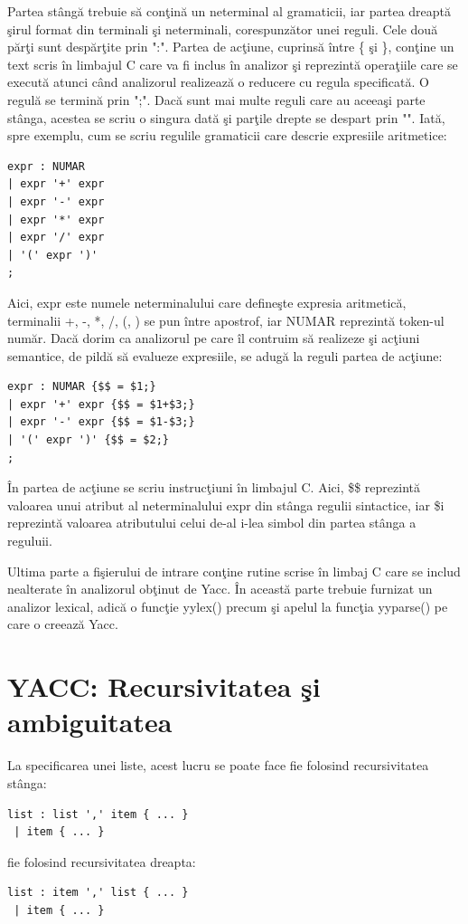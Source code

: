 Partea st\^{a}ng\u{a} trebuie s\u{a} con\c{t}in\u{a} un neterminal al gramaticii, iar partea dreapt\u{a} \c{s}irul format din terminali \c{s}i neterminali, corespunz\u{a}tor unei reguli. Cele dou\u{a} p\u{a}r\c{t}i sunt desp\u{a}r\c{t}ite prin ":". Partea de ac\c{t}iune, cuprins\u{a} \^{i}ntre \{ \c{s}i \}, con\c{t}ine un text scris \^{i}n limbajul C care va fi inclus \^{i}n analizor \c{s}i reprezint\u{a} opera\c{t}iile care se execut\u{a} atunci c\^{a}nd analizorul realizeaz\u{a} o reducere cu regula specificat\u{a}. O regul\u{a} se termin\u{a} prin ";". Dac\u{a} sunt mai multe reguli care au aceea\c{s}i parte st\^{a}nga, acestea se scriu o singura dat\u{a} \c{s}i par\c{t}ile drepte se despart prin "\textbar". Iat\u{a}, spre exemplu, cum se scriu regulile gramaticii care descrie expresiile aritmetice:
\begin{verbatim}
expr : NUMAR
| expr '+' expr
| expr '-' expr
| expr '*' expr
| expr '/' expr
| '(' expr ')'
;
\end{verbatim}

Aici, expr este numele neterminalului care define\c{s}te expresia aritmetic\u{a}, terminalii +, -, *, /, (, ) se pun \^{i}ntre apostrof, iar NUMAR reprezint\u{a} token-ul num\u{a}r. Dac\u{a} dorim ca analizorul pe care \^{i}l contruim s\u{a} realizeze \c{s}i ac\c{t}iuni semantice, de pild\u{a} s\u{a} evalueze expresiile, se adug\u{a} la reguli partea de ac\c{t}iune:
\begin{verbatim}
expr : NUMAR {$$ = $1;}
| expr '+' expr {$$ = $1+$3;}
| expr '-' expr {$$ = $1-$3;}
| '(' expr ')' {$$ = $2;}
;
\end{verbatim}

\^{I}n partea de ac\c{t}iune se scriu instruc\c{t}iuni \^{i}n limbajul C. Aici, \$\$ reprezint\u{a} valoarea unui atribut al neterminalului expr din st\^{a}nga regulii sintactice, iar \$i reprezint\u{a} valoarea atributului celui de-al i-lea simbol din partea st\^{a}nga a reguluii.

Ultima parte a fi\c{s}ierului de intrare con\c{t}ine rutine scrise \^{i}n limbaj C care se includ nealterate \^{i}n analizorul ob\c{t}inut de Yacc. \^{I}n aceast\u{a} parte trebuie furnizat un analizor lexical, adic\u{a} o func\c{t}ie yylex() precum \c{s}i apelul la func\c{t}ia yyparse() pe care o creeaz\u{a} Yacc.

\section{YACC: Recursivitatea \c{s}i ambiguitatea}
La specificarea unei liste, acest lucru se poate face fie folosind recursivitatea st\^{a}nga:
\begin{verbatim}
list : list ',' item { ... }
 | item { ... }
\end{verbatim}
fie folosind recursivitatea dreapta:
\begin{verbatim}
list : item ',' list { ... }
 | item { ... }
\end{verbatim}

